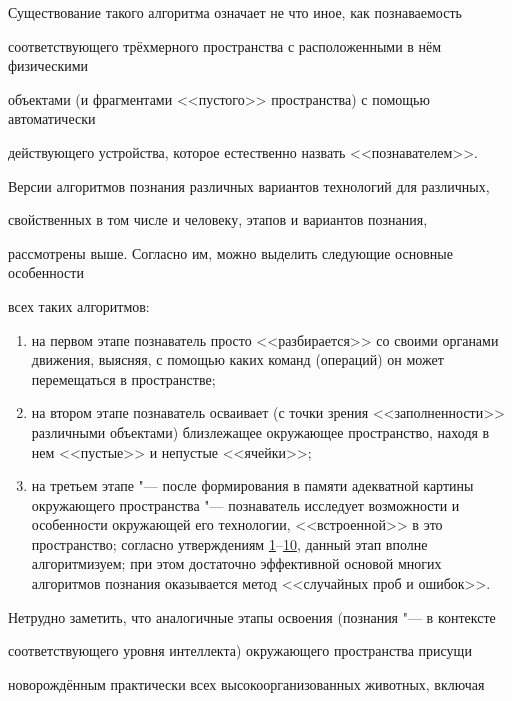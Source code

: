 \smallskip



Существование такого алгоритма означает не что иное, как познаваемость

соответствующего трёхмерного пространства с расположенными в нём физическими

объектами (и фрагментами <<пустого>> пространства) с помощью автоматически

действующего устройства, которое естественно назвать <<познавателем>>.



Версии алгоритмов познания различных вариантов технологий для различных,

свойственных в том числе и человеку, этапов и вариантов познания,

рассмотрены выше. Согласно им, можно выделить следующие основные особенности

всех таких алгоритмов:



\begin{enumerate}

\item на первом этапе познаватель просто <<разбирается>> со своими органами движения, выясняя, с помощью каких команд (операций) он может перемещаться в пространстве;

\item на втором этапе познаватель осваивает (с точки зрения <<заполненности>> различными объектами) близлежащее окружающее пространство, находя в нем <<пустые>> и непустые <<ячейки>>;

\item на третьем этапе "--- после формирования в памяти адекватной картины окружающего пространства "--- познаватель исследует возможности и особенности окружающей его технологии, <<встроенной>> в это пространство; согласно утверждениям \hyperlink{kr:utv1}{1}--\hyperlink{kr:utv10}{10}, данный этап вполне алгоритмизуем; при этом достаточно эффективной основой многих алгоритмов познания оказывается метод <<случайных проб и ошибок>>.

\end{enumerate}



Нетрудно заметить, что аналогичные этапы освоения (познания "--- в контексте

соответствующего уровня интеллекта) окружающего пространства присущи

новорождённым практически всех высокоорганизованных животных, включая

